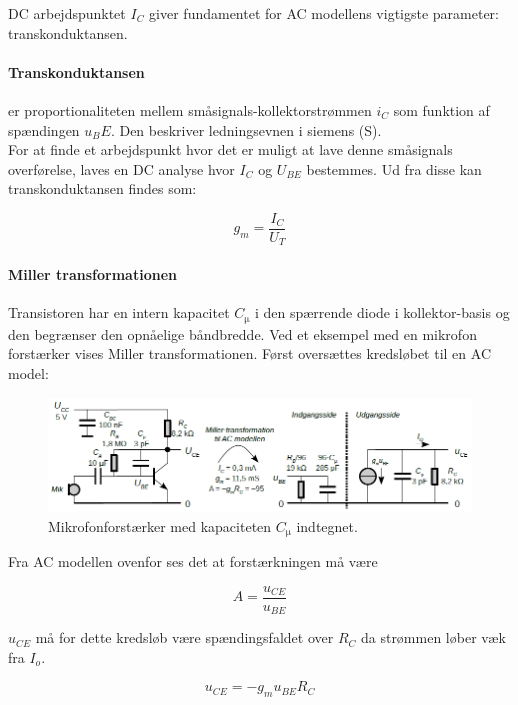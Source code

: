 \documentclass[danish]{article}
\begin{document}
DC arbejdspunktet $I_C$ giver fundamentet for AC modellens vigtigste parameter: transkonduktansen.

\paragraph{Transkonduktansen} er proportionaliteten mellem småsignals-kollektorstrømmen $i_C$ som funktion af spændingen $u_BE$. 
Den beskriver ledningsevnen i siemens (S).\\

For at finde et arbejdspunkt hvor det er muligt at lave denne småsignals overførelse, laves en DC analyse hvor $I_C$  og $U_{BE}$ bestemmes. Ud fra disse kan transkonduktansen findes som:

\begin{equation} 
g_m = \dfrac{I_C}{U_T}
\end{equation}

\paragraph{Miller transformationen} 
Transistoren har en intern kapacitet $C_{\si{\micro}}$ i den spærrende diode i kollektor-basis og den begrænser den opnåelige båndbredde.
Ved et eksempel med en mikrofon forstærker vises Miller transformationen. Først oversættes kredsløbet til en AC model:
\begin{figure} [H]
	\centering
	\includegraphics[width=\linewidth]{graphics/millertransformation}
	\caption{Mikrofonforstærker med kapaciteten $C_{\si{\micro}}$ indtegnet.}
	\label{fig:millertransformation}
\end{figure}
Fra AC modellen ovenfor ses det at forstærkningen må være 

\begin{equation} 
A = \dfrac{u_{CE}}{u_{BE}}
\end{equation}

$u_{CE}$ må for dette kredsløb være spændingsfaldet over $R_C$ da strømmen løber væk fra $I_o$.

\begin{equation} 
u_{CE} = -g_m u_{BE}R_C
\end{equation}
\end{document}
